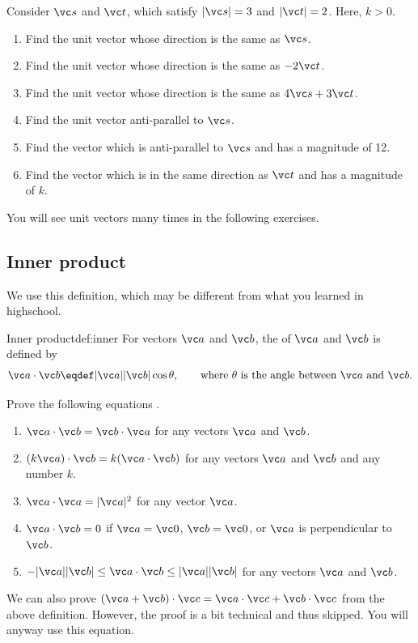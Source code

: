 \documentclass[11pt,pdfa,lastpage]{MishoNote}
\begin{document}
\begin{problems}
 \Problem[A] Consider $\vc s$ and $\vc t$, which satisfy $|\vc s|=3$ and $|\vc t|=2$. Here, $k>0$.
 \begin{enumerate}
   \item Find the unit vector whose direction is the same as $\vc s$.
   \item Find the unit vector whose direction is the same as $-2\vc t$.
   \item Find the unit vector whose direction is the same as $4\vc s+3\vc t$.
   \item Find the unit vector anti-parallel to $\vc s$.
   \item Find the vector which is anti-parallel to $\vc s$ and has a magnitude of 12.
   \item Find the vector which is in the same direction as $\vc t$ and has a magnitude of $k$.
 \end{enumerate}
\end{problems}

You will see unit vectors many times in the following exercises.

\newpage
\subsection{Inner product}
We use this definition, which may be different from what you learned in highschool.
\begin{definition}{Inner product}{def:inner}
  For vectors $\vc a$ and $\vc b$, the  of $\vc a$ and $\vc b$ is defined by
  \[ \vc a\cdot\vc b\deq|\vc a||\vc b|\cos\theta, \qquad \text{where $\theta$ is the angle between $\vc a$ and $\vc b$.} \]
\end{definition}
\begin{problems}
  \Problem[A] Prove the following equations .
  \begin{enumerate}
    \item $\vc a\cdot\vc b=\vc b\cdot\vc a$ for any vectors $\vc a$ and $\vc b$.
    \item $(k\vc a)\cdot\vc b=k(\vc a\cdot\vc b)$ for any vectors $\vc a$ and $\vc b$ and any number $k$.
    \item $\vc a\cdot\vc a=|\vc a|^2$ for any vector $\vc a$.
    \item $\vc a\cdot\vc b=0$ if $\vc a=\vc 0$, $\vc b=\vc 0$, or $\vc a$ is perpendicular to $\vc b$.
    \item $-|\vc a||\vc b|\le \vc a\cdot\vc b\le|\vc a||\vc b|$ for any vectors $\vc a$ and $\vc b$.
  \end{enumerate}
\end{problems}
We can also prove $(\vc a+\vc b)\cdot\vc c=\vc a\cdot\vc c+\vc b\cdot \vc c$ from the above definition. However, the proof is a bit technical and thus skipped. You will anyway use this equation.
\end{document}
